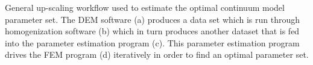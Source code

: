 \label{fig:workflow} General up-scaling workflow used to estimate the optimal continuum model parameter set. The DEM software (a) produces a data set which is run through homogenization software (b) which in turn produces another dataset that is fed into the parameter estimation program (c). This parameter estimation program drives the FEM program (d) iteratively in order to find an optimal parameter set.  
